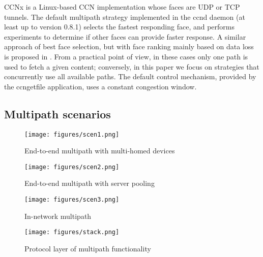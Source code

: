 \documentclass{sig-alternate-10pt}
\begin{document}
CCNx \cite{ccnx} is a Linux-based CCN implementation whose faces are UDP or TCP tunnels. The default multipath strategy implemented in the ccnd daemon (at least up to version 0.8.1) selects the fastest responding face, and performs experiments to determine if other faces can provide faster response. A similar approach of best face selection, but with face ranking mainly based on data loss is proposed in \cite{yi2013case}. From a practical point of view, in these cases only one path is used to fetch a given content; conversely, in this paper we focus on strategies that concurrently use all available paths. The default control mechanism, provided by the ccngetfile application, uses a constant congestion window.


\subsection*{Multipath scenarios}

\begin{figure}[t]
\centering
\texttt{[image: figures/scen1.png]}
\caption{End-to-end multipath with multi-homed devices}
\label{f:scen1}
\vspace{-10pt}
\end{figure}

\begin{figure}[t]
\centering
\texttt{[image: figures/scen2.png]}
\caption{End-to-end multipath with server pooling}
\label{f:scen2}
\vspace{-10pt}
\end{figure}

\begin{figure}[t]
\centering
\texttt{[image: figures/scen3.png]}
\caption{In-network multipath}
\label{f:scen3}
\vspace{-10pt}
\end{figure}

\begin{figure}[t]
\centering
\texttt{[image: figures/stack.png]}
\caption{Protocol layer of multipath functionality}
\label{f:stack}
\vspace{-10pt}
\end{figure}
\end{document}
